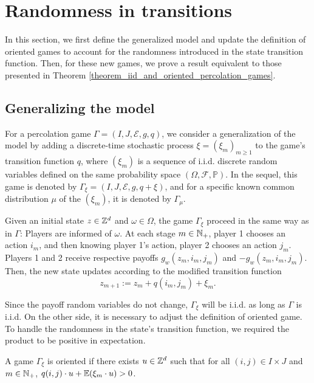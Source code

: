  \section{Randomness in transitions}
 	In this section, we first define the generalized model and update the definition of oriented games to account for the randomness introduced in the state transition function. Then, for these new games, we prove a result equivalent to those presented in Theorem \ref{theorem_iid_and_oriented_percolation_games}.

	\subsection{Generalizing the model}
	For a percolation game $\Gamma = (I, J, \mathcal{E}, g, q)$, we consider a generalization of the model by adding a discrete-time stochastic process $\xi = (\xi_m)_{m \geq 1}$ to the game's transition function $q$, where $(\xi_m)$ is a sequence of i.i.d. discrete random variables defined on the same probability space $(\Omega, \mathcal{F}, \mathbb{P})$. In the sequel, this game is denoted by $\Gamma_{\xi} = (I, J, \mathcal{E}, g, q + \xi)$, and for a specific known common distribution $\mu$ of the $(\xi_m)$, it is denoted by $\Gamma_{\mu}$. 
	
	Given an initial state $z \in \mathbb{Z}^d$  and $\omega \in \Omega$, the game $\Gamma_{\xi}$ proceed in the same way as in $\Gamma$: Players are informed of $\omega$. At each stage $m \in \mathbb{N}_+$, player 1 chooses an action $i_m$, and then knowing player 1's action, player 2 chooses an action $j_m$. Players 1 and 2 receive respective payoffs $g_w(z_m, i_m, j_m)$ and $-g_w(z_m, i_m, j_m)$. Then, the new state updates according to the modified transition function 
	\[
		z_{m+1} := z_m + q(i_m, j_m) + \xi_{m}.
	\]
	
	Since the payoff random variables do not change, $\Gamma_{\xi}$ will be i.i.d. as long as $\Gamma$ is i.i.d. On the other side, it is necessary to adjust the definition of oriented game. To handle the randomness in the state's transition function, we required the product to be positive in expectation.
	
	\begin{definition} A game $\Gamma_{\xi}$ is oriented if there exists $u \in \mathbb{Z}^d$ such that for all $(i, j) \in I \times J$ and $m \in \mathbb{N}_+$, $q(i, j)\cdot u + \mathbb{E}(\xi_m \cdot u) > 0$.
	\end{definition}
	
